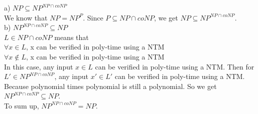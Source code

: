 \documentclass[12pt]{article}
\begin{document}
a) $NP \subseteq NP^{NP \cap coNP}$ \\

We know that $NP = NP^P$. Since $P \subseteq NP \cap coNP$, we get $NP
\subseteq NP^{NP \cap coNP}$. \\

b) $NP^{NP \cap coNP} \subseteq NP$ \\

$L \in NP \cap coNP$ means that \\

$\forall x \in L$, x can be verified in poly-time using a NTM \\
$\forall x \notin L$, x can be verified in poly-time using a NTM \\

In this case, any input $x \in L$ can be verified in poly-time using a
NTM. Then for $L' \in NP^{NP \cap coNP}$, any input $x' \in L'$ can be
verified in poly-time using a NTM. Because polynomial times polynomial
is still a polynomial. So we get $NP^{NP \cap coNP} \subseteq NP$. \\

To sum up, $NP^{NP \cap coNP} = NP$.
\end{document}
